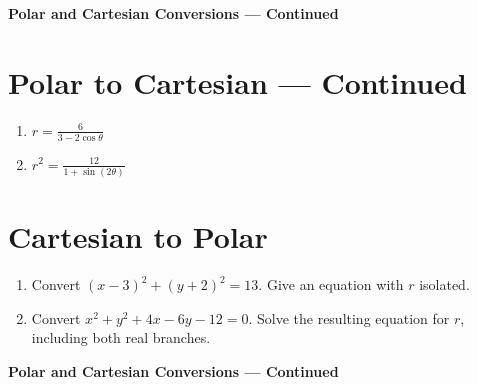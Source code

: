 \documentclass[12pt]{article}
\begin{document}
\newpage
\begin{center}
  {\large\textbf{Polar and Cartesian Conversions --- Continued}}
\end{center}

\section*{Polar to Cartesian --- Continued}
\begin{enumerate}[leftmargin=*,itemsep=0pt,resume]
  \item $\displaystyle r=\frac{6}{3-2\cos\theta}$
  \par{}

  \item $\displaystyle r^2=\frac{12}{1+\sin(2\theta)}$
  \par{}
\end{enumerate}

\section*{Cartesian to Polar}
\begin{enumerate}[leftmargin=*,itemsep=0pt,resume]
  \item Convert $(x-3)^2+(y+2)^2=13$. Give an equation with $r$ isolated.
  \par{}

  \item Convert $x^2+y^2+4x-6y-12=0$.
  Solve the resulting equation for $r$, including both real branches.
  \par{}
\end{enumerate}

\newpage
\begin{center}
  {\large\textbf{Polar and Cartesian Conversions --- Continued}}
\end{center}
\end{document}
